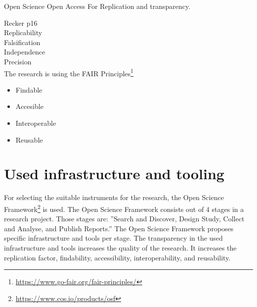 Open Science
Open Access
For Replication and transparency.


Recker p16\\
Replicability\\
Falsification\\
Independence\\
Precision\\

The research is using the FAIR Principles\footnote{\url{https://www.go-fair.org/fair-principles/}}\\
\begin{itemize}
	\item{Findable}
	\item{Accesible}
	\item{Interoperable}
	\item{Reusable}
\end{itemize}

\section{Used infrastructure and tooling}
For selecting the suitable instruments for the research, the Open Science Framework\footnote{\url{https://www.cos.io/products/osf}} is used. The Open Science Framework consists out of 4 stages in a research project. Those stages are: ''Search and Discover, Design Study, Collect and Analyse, and Publish Reports.'' The Open Science Framework proposes specific infrastructure and tools per stage. The transparency in the used infrastructure and tools increases the quality of the research. It increases the replication factor, findability, accessibility, interoperability, and reusability.
